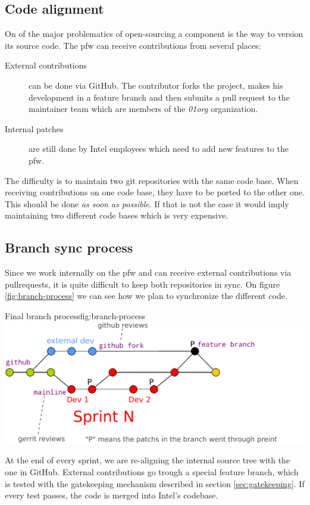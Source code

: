 \subsection{Code alignment}
On of the major problematics of open-sourcing a component is the way to version its source code.
The \gls{pfw} can receive contributions from several places:
\begin{description}
    \item[External contributions] can be done via \gls{GitHub}. The contributor forks the project, makes his development in a feature
        branch and then submits a pull request to the maintainer team which are members of the \emph{01org} organization.
    \item[Internal patches] are still done by Intel employees which need to add new features to the \gls{pfw}.
\end{description}
The difficulty is to maintain two \gls{git} repositories with the same code base. When receiving contributions on one code base, they
have to be ported to the other one. This should be done \emph{as soon as possible}. If that is not the case it would imply maintaining two different
code bases which is very expensive.

\subsection{Branch sync process}\label{sec:syncProcess}
Since we work internally on the \gls{pfw} and can receive external contributions via \gls{pullrequests},
it is quite difficult to keep both repositories in sync.
On figure \ref{fig:branch-process} we can see how we plan to synchronize the different code.

\begin{figureGraphics}{Final branch process}{fig:branch-process}
    \includegraphics[width=\textwidth]{./src/img/branches-process.pdf}
\end{figureGraphics}
At the end of every sprint, we are re-aligning the internal source tree with the one in \gls{GitHub}.
External contributions go trough a special feature branch, which is tested with the gatekeeping mechanism described in section \ref{sec:gatekeeping}.
If every test passes, the code is merged into Intel's codebase.

